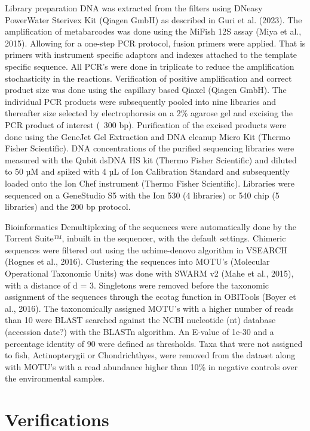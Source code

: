 \documentclass[12pt]{article}
\begin{document}
Library preparation
DNA was extracted from the filters using DNeasy PowerWater Sterivex Kit (Qiagen GmbH) as described in Guri et al. (2023). The amplification of metabarcodes was done using the MiFish 12S assay (Miya et al., 2015). Allowing for a one-step PCR protocol, fusion primers were applied. That is primers with instrument specific adaptors and indexes attached to the template specific sequence. All PCR’s were done in triplicate to reduce the amplification stochasticity in the reactions. Verification of positive amplification and correct product size was done using the capillary based Qiaxel (Qiagen GmbH). The individual PCR products were subsequently pooled into nine libraries and thereafter size selected by electrophoresis on a 2\% agarose gel and excising the PCR product of interest (~300 bp). Purification of the excised products were done using the GeneJet Gel Extraction and DNA cleanup Micro Kit (Thermo Fisher Scientific). DNA concentrations of the purified sequencing libraries were measured with the Qubit dsDNA HS kit (Thermo Fisher Scientific) and diluted to 50 µM and spiked with 4 µL of Ion Calibration Standard and subsequently loaded onto the Ion Chef instrument (Thermo Fisher Scientific). Libraries were sequenced on a GeneStudio S5 with the Ion 530 (4 libraries) or 540 chip (5 libraries) and the 200 bp protocol.

Bioinformatics
Demultiplexing of the sequences were automatically done by the Torrent Suite™, inbuilt in the sequencer, with the default settings. Chimeric sequences were filtered out using the uchime-denovo algorithm in VSEARCH (Rognes et al., 2016). Clustering the sequences into MOTU’s (Molecular Operational Taxonomic Units) was done with SWARM v2 (Mahe et al., 2015), with a distance of d = 3. Singletons were removed before the taxonomic assignment of the sequences through the ecotag  function in OBITools (Boyer et al., 2016). The taxonomically assigned MOTU’s with a higher number of reads than 10 were BLAST searched against the NCBI nucleotide (nt) database (accession date?) with the BLASTn algorithm. An E-value of 1e-30 and a percentage identity of 90 were defined as thresholds. Taxa that were not assigned to fish, Actinopterygii or Chondrichthyes, were removed from the dataset along with MOTU’s with a read abundance higher than 10\% in negative controls over the environmental samples.


\section{Verifications}
\label{sec:verify}
\end{document}
